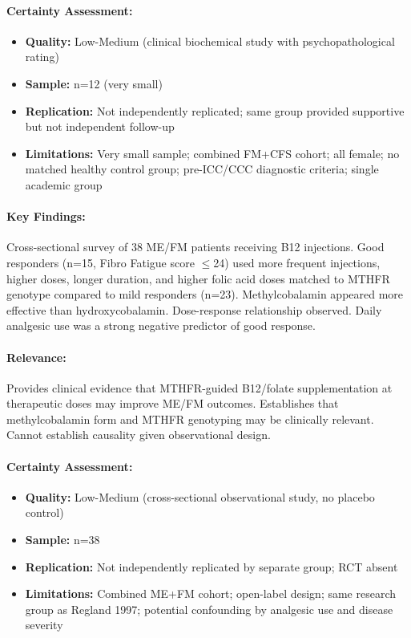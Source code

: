 \paragraph{Certainty Assessment:}
\begin{itemize}
  \item \textbf{Quality:} Low-Medium (clinical biochemical study with psychopathological rating)
  \item \textbf{Sample:} n=12 (very small)
  \item \textbf{Replication:} Not independently replicated; same group provided supportive but
    not independent follow-up
  \item \textbf{Limitations:} Very small sample; combined FM+CFS cohort; all female; no matched
    healthy control group; pre-ICC/CCC diagnostic criteria; single academic group
\end{itemize}

\bigskip


\paragraph{Key Findings:}
Cross-sectional survey of 38 ME/FM patients receiving B12 injections. Good responders (n=15,
Fibro Fatigue score $\leq$24) used more frequent injections, higher doses, longer duration, and
higher folic acid doses matched to MTHFR genotype compared to mild responders (n=23). Methylcobalamin
appeared more effective than hydroxycobalamin. Dose-response relationship observed. Daily analgesic
use was a strong negative predictor of good response.

\paragraph{Relevance:}
Provides clinical evidence that MTHFR-guided B12/folate supplementation at therapeutic doses may
improve ME/FM outcomes. Establishes that methylcobalamin form and MTHFR genotyping may be clinically
relevant. Cannot establish causality given observational design.

\paragraph{Certainty Assessment:}
\begin{itemize}
  \item \textbf{Quality:} Low-Medium (cross-sectional observational study, no placebo control)
  \item \textbf{Sample:} n=38
  \item \textbf{Replication:} Not independently replicated by separate group; RCT absent
  \item \textbf{Limitations:} Combined ME+FM cohort; open-label design; same research group as
    Regland 1997; potential confounding by analgesic use and disease severity
\end{itemize}

